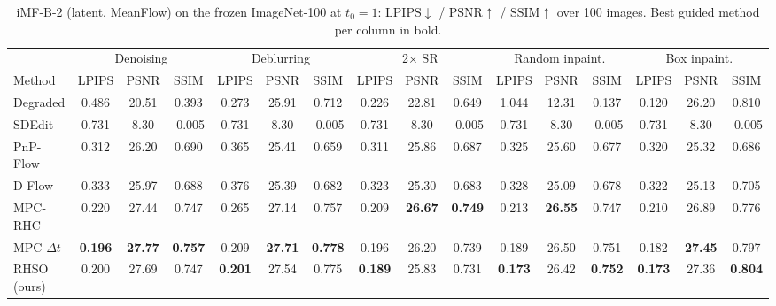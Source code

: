 \begin{table}[t]
\centering
\small
\setlength{\tabcolsep}{3.5pt}
\caption{iMF-B-2 (latent, MeanFlow) on the frozen ImageNet-100 at $t_0 = 1$: LPIPS$\downarrow$ / PSNR$\uparrow$ / SSIM$\uparrow$ over 100 images. Best guided method per column in bold.}
\label{tab:final_imf}
\begin{tabular}{lccccccccccccccc}
\toprule
 & \multicolumn{3}{c}{Denoising} & \multicolumn{3}{c}{Deblurring} & \multicolumn{3}{c}{2$\times$ SR} & \multicolumn{3}{c}{Random inpaint.} & \multicolumn{3}{c}{Box inpaint.} \\
\cmidrule(lr){2-4} \cmidrule(lr){5-7} \cmidrule(lr){8-10} \cmidrule(lr){11-13} \cmidrule(lr){14-16}
Method & LPIPS & PSNR & SSIM & LPIPS & PSNR & SSIM & LPIPS & PSNR & SSIM & LPIPS & PSNR & SSIM & LPIPS & PSNR & SSIM \\
\midrule
Degraded & 0.486 & 20.51 & 0.393 & 0.273 & 25.91 & 0.712 & 0.226 & 22.81 & 0.649 & 1.044 & 12.31 & 0.137 & 0.120 & 26.20 & 0.810 \\
\midrule
SDEdit & 0.731 & 8.30 & -0.005 & 0.731 & 8.30 & -0.005 & 0.731 & 8.30 & -0.005 & 0.731 & 8.30 & -0.005 & 0.731 & 8.30 & -0.005 \\
PnP-Flow & 0.312 & 26.20 & 0.690 & 0.365 & 25.41 & 0.659 & 0.311 & 25.86 & 0.687 & 0.325 & 25.60 & 0.677 & 0.320 & 25.32 & 0.686 \\
D-Flow & 0.333 & 25.97 & 0.688 & 0.376 & 25.39 & 0.682 & 0.323 & 25.30 & 0.683 & 0.328 & 25.09 & 0.678 & 0.322 & 25.13 & 0.705 \\
MPC-RHC & 0.220 & 27.44 & 0.747 & 0.265 & 27.14 & 0.757 & 0.209 & \textbf{26.67} & \textbf{0.749} & 0.213 & \textbf{26.55} & 0.747 & 0.210 & 26.89 & 0.776 \\
MPC-$\Delta t$ & \textbf{0.196} & \textbf{27.77} & \textbf{0.757} & 0.209 & \textbf{27.71} & \textbf{0.778} & 0.196 & 26.20 & 0.739 & 0.189 & 26.50 & 0.751 & 0.182 & \textbf{27.45} & 0.797 \\
RHSO (ours) & 0.200 & 27.69 & 0.747 & \textbf{0.201} & 27.54 & 0.775 & \textbf{0.189} & 25.83 & 0.731 & \textbf{0.173} & 26.42 & \textbf{0.752} & \textbf{0.173} & 27.36 & \textbf{0.804} \\
\bottomrule
\end{tabular}
\end{table}

